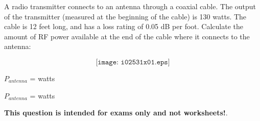 

A radio transmitter connects to an antenna through a coaxial cable.  The output of the transmitter (measured at the beginning of the cable) is 130 watts.  The cable is 12 feet long, and has a loss rating of 0.05 dB per foot.  Calculate the amount of RF power available at the end of the cable where it connects to the antenna:

$$\texttt{[image: i02531x01.eps]}$$

$P_{antenna}$ = \underbar{\hskip 50pt} watts







$P_{antenna}$ =  watts







{\bf This question is intended for exams only and not worksheets!}.



